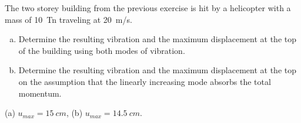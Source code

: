 
\begin{Exercise}[label={two_storey_helicopter}]
The two storey building from the previous exercise is hit by a helicopter with a mass of \SI{10}{Tn} traveling at \SI{20}{m/s}.
\begin{enumerate}[(a)]
    \item Determine the resulting vibration and the maximum displacement at the top of the building using both modes of vibration.
    \item Determine the resulting vibration and the maximum displacement at the top on the assumption that the linearly increasing mode absorbs the total momentum.
\end{enumerate}
\shortAnswer (a) $u_{max} = \SI{15}{cm}$, (b) $u_{max} = \SI{14.5}{cm}$.
\end{Exercise}



